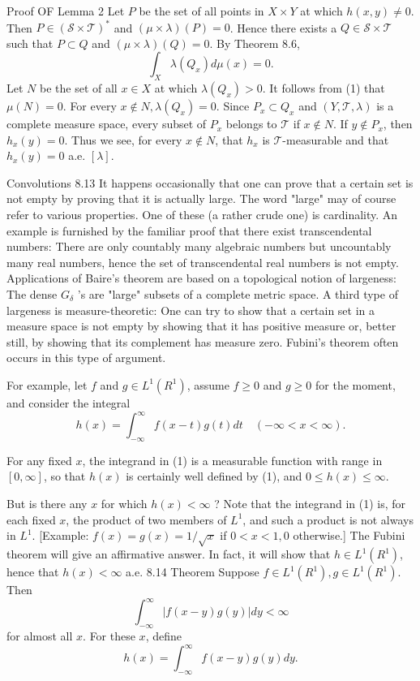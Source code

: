 Proof OF Lemma 2 Let $P$ be the set of all points in $X \times Y$ at which $h(x, y) \neq 0$. Then $P \in(\mathscr{S} \times \mathscr{T})^*$ and $(\mu \times \lambda)(P)=0$. Hence there exists a $Q \in \mathscr{S} \times \mathscr{T}$ such that $P \subset Q$ and $(\mu \times \lambda)(Q)=0$. By Theorem 8.6,
$$
\int_X \lambda\left(Q_x\right) d \mu(x)=0 .
$$
Let $N$ be the set of all $x \in X$ at which $\lambda\left(Q_x\right)>0$. It follows from (1) that $\mu(N)=0$. For every $x \notin N, \lambda\left(Q_x\right)=0$. Since $P_x \subset Q_x$ and $(Y, \mathscr{T}, \lambda)$ is a complete measure space, every subset of $P_x$ belongs to $\mathscr{T}$ if $x \notin N$. If $y \notin P_x$, then $h_x(y)=0$. Thus we see, for every $x \notin N$, that $h_x$ is $\mathscr{T}$-measurable and that $h_x(y)=0$ a.e. $[\lambda]$.

Convolutions
8.13 It happens occasionally that one can prove that a certain set is not empty by proving that it is actually large. The word "large" may of course refer to various properties. One of these (a rather crude one) is cardinality. An example is furnished by the familiar proof that there exist transcendental numbers: There are only countably many algebraic numbers but uncountably many real numbers, hence the set of transcendental real numbers is not empty. Applications of Baire's theorem are based on a topological notion of largeness: The dense $G_\delta$ 's are "large" subsets of a complete metric space. A third type of largeness is measure-theoretic: One can try to show that a certain set in a measure space is not empty by showing that it has positive measure or, better still, by showing that its complement has measure zero. Fubini's theorem often occurs in this type of argument.

For example, let $f$ and $g \in L^1\left(R^1\right)$, assume $f \geq 0$ and $g \geq 0$ for the moment, and consider the integral
$$
h(x)=\int_{-\infty}^{\infty} f(x-t) g(t) d t \quad(-\infty<x<\infty) .
$$

For any fixed $x$, the integrand in (1) is a measurable function with range in $[0, \infty]$, so that $h(x)$ is certainly well defined by (1), and $0 \leq h(x) \leq \infty$.

But is there any $x$ for which $h(x)<\infty$ ? Note that the integrand in (1) is, for each fixed $x$, the product of two members of $L^1$, and such a product is not always in $L^1$. [Example: $f(x)=g(x)=1 / \sqrt{x}$ if $0<x<1,0$ otherwise.] The Fubini theorem will give an affirmative answer. In fact, it will show that $h \in L^1\left(R^1\right)$, hence that $h(x)<\infty$ a.e.
8.14 Theorem Suppose $f \in L^1\left(R^1\right), g \in L^1\left(R^1\right)$. Then
$$
\int_{-\infty}^{\infty}|f(x-y) g(y)| d y<\infty
$$
for almost all $x$. For these $x$, define
$$
h(x)=\int_{-\infty}^{\infty} f(x-y) g(y) d y .
$$

